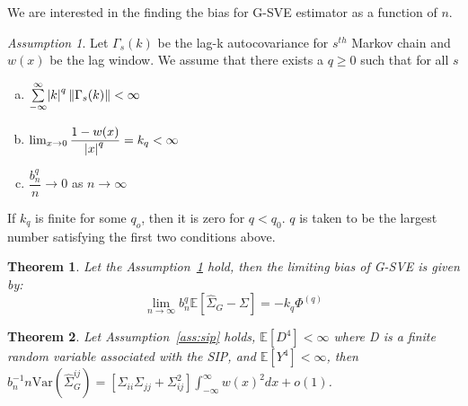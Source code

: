 \documentclass[11pt]{article}
\newcommand{\E}{\mathbb{E}}
\newcommand{\Var}{\text{Var}}
\newtheorem{theorem}{Theorem}
\theoremstyle{remark}
\newtheorem{ass}{Assumption}
\begin{document}


We are interested in the finding the bias for G-SVE estimator as a function of $n$. 
\begin{ass} \label{ass:bias}
    Let $\Gamma_s(k)$ be the lag-k autocovariance for $s^{th}$ Markov chain and $w(x)$ be the lag window. We assume that there exists a $q \geq 0$ such that for all $s$
    \begin{enumerate} [a.]
        \item $\sum\limits_{-\infty}^{\infty}\abs{k}^q \|\Gamma_s(k)\| < \infty$
        \item $\lim _{x \to 0}\dfrac{1 - w(x)}{\abs{x}^q} = k_q < \infty$
        \item $\dfrac{b_n^q}{n} \to 0$ as $n \to \infty$
    \end{enumerate}
    
    If $k_q$ is finite for some $q_o$, then it is zero for $q < q_0$. $q$ is taken to be the largest number satisfying the first two conditions above.
\end{ass}


\begin{theorem}\label{th:G-SVE_bias}
Let the Assumption~\ref{ass:bias} hold, then the limiting bias of G-SVE is given by:
\[
 \lim_{n \to \infty}b_n^q\mathbb{E} \left[\hat{\Sigma}_{G} - \Sigma \right] = -k_q\Phi^{(q)}
 \]
\end{theorem}




\begin{theorem} \label{th:G-SVE_variance}
 Let Assumption~\ref{ass:sip} holds, $\E[D^4] < \infty$ where D is a finite random variable associated with the SIP, and  $\E[Y^4] < \infty$, then $b_n^{-1}{n}\Var \left(\hat{\Sigma}_{G}^{ij} \right) = [\Sigma_{ii}\Sigma_{jj} + \Sigma_{ij}^2]\int_{-\infty}^{\infty}w(x)^2dx  + o(1)$.
\end{theorem}
\end{document}
